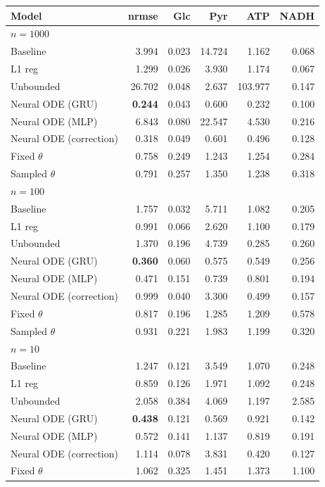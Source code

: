 \begin{tabular}{lrrrrr}
\toprule
Model & nrmse & Glc & Pyr & ATP & NADH \\
\midrule
\multicolumn{6}{l}{\textbf{$n=1000$}} \\
Baseline & 3.994 & 0.023 & 14.724 & 1.162 & 0.068 \\
L1 reg & 1.299 & 0.026 & 3.930 & 1.174 & 0.067 \\
Unbounded & 26.702 & 0.048 & 2.637 & 103.977 & 0.147 \\
Neural ODE (GRU) & \textbf{0.244} & 0.043 & 0.600 & 0.232 & 0.100 \\
Neural ODE (MLP) & 6.843 & 0.080 & 22.547 & 4.530 & 0.216 \\
Neural ODE (correction) & 0.318 & 0.049 & 0.601 & 0.496 & 0.128 \\
Fixed $\theta$ & 0.758 & 0.249 & 1.243 & 1.254 & 0.284 \\
Sampled $\theta$ & 0.791 & 0.257 & 1.350 & 1.238 & 0.318 \\
\midrule
\multicolumn{6}{l}{\textbf{$n=100$}} \\
Baseline & 1.757 & 0.032 & 5.711 & 1.082 & 0.205 \\
L1 reg & 0.991 & 0.066 & 2.620 & 1.100 & 0.179 \\
Unbounded & 1.370 & 0.196 & 4.739 & 0.285 & 0.260 \\
Neural ODE (GRU) & \textbf{0.360} & 0.060 & 0.575 & 0.549 & 0.256 \\
Neural ODE (MLP) & 0.471 & 0.151 & 0.739 & 0.801 & 0.194 \\
Neural ODE (correction) & 0.999 & 0.040 & 3.300 & 0.499 & 0.157 \\
Fixed $\theta$ & 0.817 & 0.196 & 1.285 & 1.209 & 0.578 \\
Sampled $\theta$ & 0.931 & 0.221 & 1.983 & 1.199 & 0.320 \\
\midrule
\multicolumn{6}{l}{\textbf{$n=10$}} \\
Baseline & 1.247 & 0.121 & 3.549 & 1.070 & 0.248 \\
L1 reg & 0.859 & 0.126 & 1.971 & 1.092 & 0.248 \\
Unbounded & 2.058 & 0.384 & 4.069 & 1.197 & 2.585 \\
Neural ODE (GRU) & \textbf{0.438} & 0.121 & 0.569 & 0.921 & 0.142 \\
Neural ODE (MLP) & 0.572 & 0.141 & 1.137 & 0.819 & 0.191 \\
Neural ODE (correction) & 1.114 & 0.078 & 3.831 & 0.420 & 0.127 \\
Fixed $\theta$ & 1.062 & 0.325 & 1.451 & 1.373 & 1.100 \\

\end{tabular}
